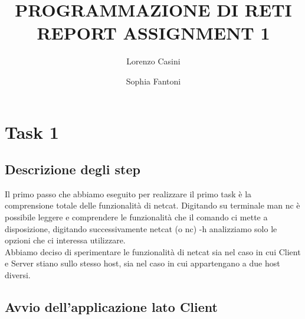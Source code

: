 \documentclass[a4paper]{article}
\begin{document}
\author{Lorenzo Casini \and Sophia Fantoni}
\title{PROGRAMMAZIONE DI RETI \\ REPORT ASSIGNMENT 1}
\maketitle

\newpage

\tableofcontents	%

\newpage


\section{Task 1}

\subsection{Descrizione degli step}
Il primo passo che abbiamo eseguito per realizzare il primo task è la comprensione totale delle funzionalità di netcat. Digitando su terminale man nc è possibile leggere e comprendere le funzionalità che il comando ci mette a disposizione, digitando successivamente netcat (o nc) -h analizziamo solo le opzioni che ci interessa utilizzare. \\
Abbiamo deciso di sperimentare le funzionalità di netcat sia nel caso in cui Client e Server stiano sullo stesso host, sia nel caso in cui appartengano a due host diversi. \\


\subsection{Avvio dell'applicazione lato Client}
\end{document}

